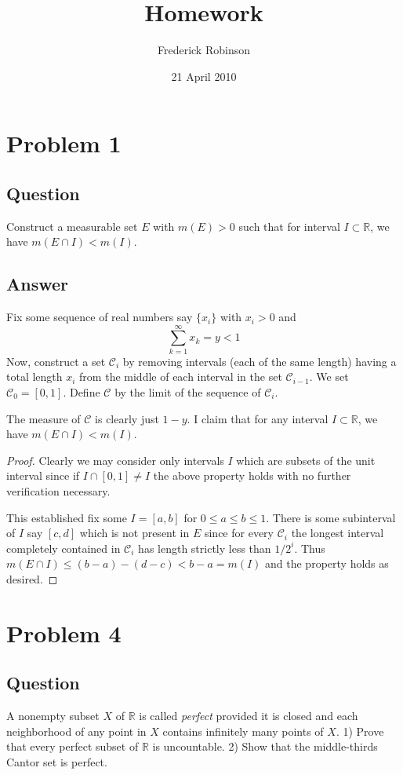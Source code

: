 \documentclass[12pt]{article}
\title{Homework}
\author{Frederick Robinson}
\date{21 April 2010}
\begin{document}

   \maketitle

\setcounter{tocdepth}{2} 


\section{Problem 1}
\subsection{Question}
Construct a measurable set $E$ with $m(E) >0$ such that for interval $I \subset \mathbb{R}$, we have $m(E \cap I) <m(I)$.
\subsection{Answer}
Fix some sequence of real numbers say $\{x_i\}$ with $x_i > 0$ and  
\[\sum_{k=1}^\infty x_k = y < 1\]
Now, construct a set $\mathcal{C}_i$ by removing intervals (each of the same length) having a total length $x_i$ from the middle of each interval in the set $\mathcal{C}_{i-1}$. We set $\mathcal{C}_0=[0,1]$. Define $\mathcal{C}$ by the limit of the sequence of $\mathcal{C}_i$.

The measure of $\mathcal{C}$ is clearly just $1-y$. I claim that for any  interval $I \subset \mathbb{R}$, we have $m(E \cap I) <m(I)$.

\begin{proof}
Clearly we may consider only intervals $I$ which are subsets of the unit interval since if $I \cap [0,1] \neq I $ the above property holds with no further verification necessary.

This established fix some $I = [a,b]$ for $0\leq a \leq b \leq 1$. There is some subinterval of $I$ say $[c,d]$ which is not present in $E$ since for every $\mathcal{C}_i$ the longest interval completely contained in $\mathcal{C}_i$ has length strictly less than $1/2^i$. Thus $m(E \cap I ) \leq (b-a) - (d-c) < b-a = m(I)$ and the property holds as desired.
\end{proof}

\section{Problem 4}
\subsection{Question}
A nonempty subset $X$ of $\mathbb{R}$ is called \emph{perfect} provided it is closed and each neighborhood of any point in $X$ contains infinitely many points of $X$. 1) Prove that every perfect subset of $\mathbb{R}$ is uncountable. 2) Show that the middle-thirds Cantor set is perfect.
\end{document}
